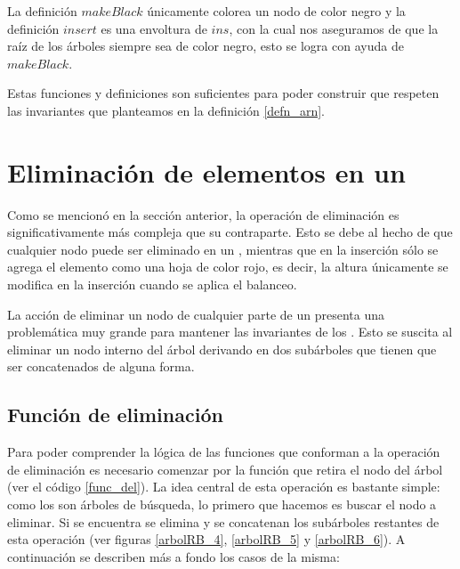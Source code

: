 La definici\'on \hyperref[raiz_negra_func]{$makeBlack$} únicamente colorea un nodo de color negro y 
la definición \hyperref[raiz_negra_func]{$insert$} es una envoltura de \hyperref[func_ins]{$ins$}, 
con la cual nos aseguramos de que la ra\'iz de los \'arboles siempre sea de color negro, esto se 
logra con ayuda de \hyperref[raiz_negra_func]{$makeBlack$}.

Estas funciones y definiciones son suficientes para poder construir {\arns} que respeten las
invariantes que planteamos en la definici\'on \ref{defn_arn}.

\section{Eliminación de elementos en un {\arn}}

Como se mencion\'o en la secci\'on anterior, la operaci\'on de eliminaci\'on es significativamente 
m\'as compleja que su contraparte. Esto se debe al hecho de que cualquier nodo puede ser eliminado 
en un {\arn}, mientras que en la inserci\'on s\'olo se agrega el elemento como una hoja de 
color rojo, es decir, la altura \'unicamente se modifica en la inserción cuando se aplica el 
balanceo.

La acci\'on de eliminar un nodo de cualquier parte de un {\arn} presenta una problemática muy grande 
para mantener las invariantes de los {\arns}. Esto se suscita al eliminar un nodo interno del 
\'arbol derivando en dos subárboles que tienen que ser concatenados de alguna forma.

\subsection{Funci\'on de eliminaci\'on}

Para poder comprender la l\'ogica de las funciones que conforman a la operaci\'on de eliminaci\'on
es necesario comenzar por la funci\'on que retira el nodo del \'arbol (ver el c\'odigo \ref{func_del}).
La idea central de esta operaci\'on es bastante simple: como los {\arns} son \'arboles de búsqueda,
lo primero que hacemos es buscar el nodo a eliminar. Si se encuentra se elimina y se concatenan los
subárboles restantes de esta operaci\'on (ver figuras \ref{arbolRB_4}, \ref{arbolRB_5} y
\ref{arbolRB_6}). A continuaci\'on se describen m\'as a fondo los casos de la misma:

